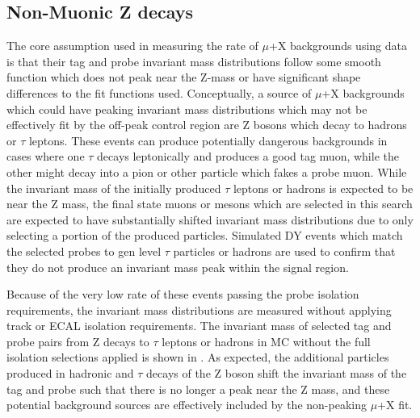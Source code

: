 \subsection{Non-Muonic Z decays}
The core assumption used in measuring the rate of $\mu$+X backgrounds using data is that their tag and probe invariant mass distributions follow some smooth function which does not peak near the Z-mass or have significant shape differences to the fit functions used.
Conceptually, a source of $\mu$+X backgrounds which could have peaking invariant mass distributions which may not be effectively fit by the off-peak control region are Z bosons which decay to hadrons or $\tau$ leptons.
These events can produce potentially dangerous backgrounds in cases where one $\tau$ decays leptonically and produces a good tag muon, while the other might decay into a pion or other particle which fakes a probe muon. 
While the invariant mass of the initially produced $\tau$ leptons or hadrons is expected to be near the Z mass, the final state muons or mesons which are selected in this search are expected to have substantially shifted invariant mass distributions due to only selecting a portion of the produced particles.
Simulated DY events which match the selected probes to gen level $\tau$ particles or hadrons are used to confirm that they do not produce an invariant mass peak within the signal region.

Because of the very low rate of these events passing the probe isolation requirements, the invariant mass distributions are measured without applying track or ECAL isolation requirements.
The invariant mass of selected tag and probe pairs from Z decays to $\tau$ leptons or hadrons in MC without the full isolation selections applied is shown in .
As expected, the additional particles produced in hadronic and $\tau$ decays of the Z boson shift the invariant mass of the tag and probe such that there is no longer a peak near the Z mass, and these potential background sources are effectively included by the non-peaking $\mu$+X fit.

